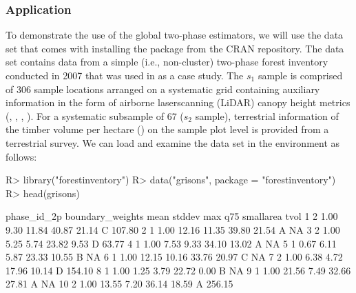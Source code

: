 \documentclass[article]{jss}
\begin{document}
\subsubsection{Application}

To demonstrate the use of the global two-phase estimators, we will use the  data set that comes with installing the package from the CRAN repository. The data set contains data from a simple (i.e., non-cluster) two-phase forest inventory conducted in 2007 that was used in \citet{mandallaz2013b} as a case study. The $s_1$ sample is comprised of 306 sample locations arranged on a systematic grid containing auxiliary information in the form of airborne laserscanning (LiDAR) canopy height metrics (, , , ). For a systematic subsample of 67 ($s_2$ sample), terrestrial information of the timber volume per hectare () on the sample plot level is provided from a terrestrial survey. We can load  and examine the  data set in the  environment as follows:


\begin{Schunk}
\begin{Sinput}
R> library("forestinventory")
R> data("grisons", package = "forestinventory")
R> head(grisons)
\end{Sinput}
\end{Schunk}



\begin{Schunk}
\begin{Soutput}
   phase_id_2p boundary_weights  mean stddev   max   q75 smallarea   tvol
1            2             1.00  9.30  11.84 40.87 21.14         C 107.80
2            1             1.00 12.16  11.35 39.80 21.54         A     NA
3            2             1.00  5.25   5.74 23.82  9.53         D  63.77
4            1             1.00  7.53   9.33 34.10 13.02         A     NA
5            1             0.67  6.11   5.87 23.33 10.55         B     NA
6            1             1.00 12.15  10.16 33.76 20.97         C     NA
7            2             1.00  6.38   4.72 17.96 10.14         D 154.10
8            1             1.00  1.25   3.79 22.72  0.00         B     NA
9            1             1.00 21.56   7.49 32.66 27.81         A     NA
10           2             1.00 13.55   7.20 36.14 18.59         A 256.15
\end{Soutput}
\end{Schunk}
\end{document}
